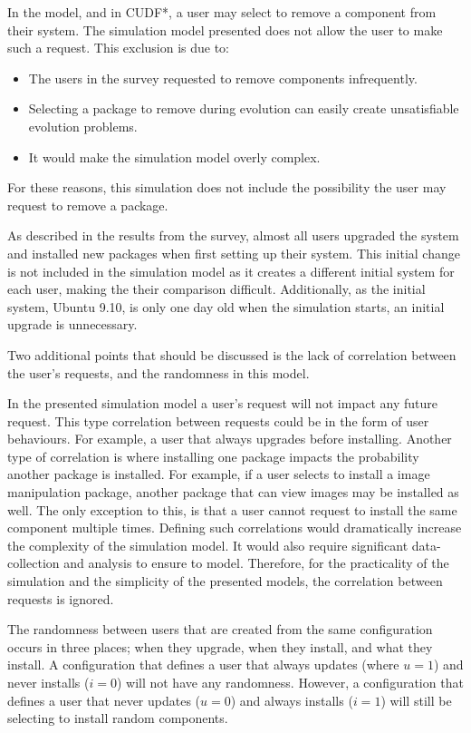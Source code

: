In the \modelname model, and in CUDF*, a user may select to remove a component from their system.
The simulation model presented does not allow the user to make such a request.
This exclusion is due to:
\begin{itemize}
  \item The users in the survey requested to remove components infrequently.
  \item Selecting a package to remove during evolution can easily create unsatisfiable evolution problems.
  \item It would make the simulation model overly complex. 
\end{itemize}
For these reasons, this simulation does not include the possibility the user may request to remove a package.

As described in the results from the survey, almost all users upgraded the system and installed new packages when first setting up their system.
This initial change is not included in the simulation model as it creates a different initial system for each user,
making the their comparison difficult.
Additionally, as the initial system, Ubuntu 9.10, is only one day old when the simulation starts, an initial upgrade is unnecessary.

Two additional points that should be discussed is the lack of correlation between the user's requests,
and the randomness in this model.

In the presented simulation model a user's request will not impact any future request.
This type correlation between requests could be in the form of user behaviours.
For example, a user that always upgrades before installing. 
Another type of correlation is where installing one package impacts the probability another package is installed.
For example, if a user selects to install a image manipulation package, another package that can view images may be installed as well.
The only exception to this, is that a user cannot request to install the same component multiple times.
Defining such correlations would dramatically increase the complexity of the simulation model.
It would also require significant data-collection and analysis to ensure to model.
Therefore, for the practicality of the simulation and the simplicity of the presented models, the correlation between requests is ignored.

The randomness between users that are created from the same configuration occurs in three places;
when they upgrade, when they install, and what they install.
A configuration that defines a user that always updates (where $u = 1$) and never installs ($i = 0$) will not have any randomness.
However, a configuration that defines a user that never updates ($u = 0$) and always installs ($i = 1$) will still be selecting to install random components.


